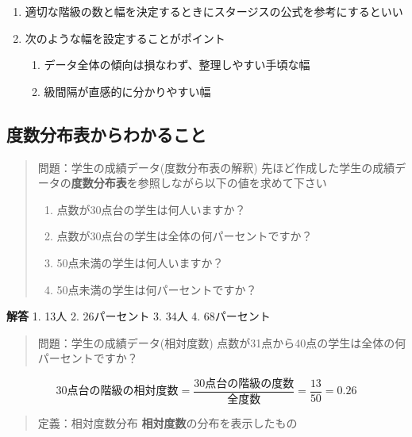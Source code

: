 \documentclass[
]{book}
\providecommand{\tightlist}{%
  \setlength{\itemsep}{0pt}\setlength{\parskip}{0pt}}
\theoremstyle{definition}
\theoremstyle{definition}
\theoremstyle{definition}
\theoremstyle{definition}
\theoremstyle{remark}
\begin{document}
\begin{enumerate}
\def\labelenumi{\arabic{enumi}.}
\setcounter{enumi}{1}
\item
  適切な階級の数と幅を決定するときにスタージスの公式を参考にするといい
\item
  次のような幅を設定することがポイント

  \begin{enumerate}
  \def\labelenumii{\arabic{enumii}.}
  \tightlist
  \item
    データ全体の傾向は損なわず、整理しやすい手頃な幅
  \item
    級間隔が直感的に分かりやすい幅
  \end{enumerate}
\end{enumerate}

\hypertarget{ux5ea6ux6570ux5206ux5e03ux8868ux304bux3089ux308fux304bux308bux3053ux3068}{%
\subsection{度数分布表からわかること}\label{ux5ea6ux6570ux5206ux5e03ux8868ux304bux3089ux308fux304bux308bux3053ux3068}}

\begin{quote}
問題：学生の成績データ(度数分布表の解釈)
先ほど作成した学生の成績データの\textbf{度数分布表}を参照しながら以下の値を求めて下さい

\begin{enumerate}
\def\labelenumi{\arabic{enumi}.}
\tightlist
\item
  点数が30点台の学生は何人いますか？
\item
  点数が30点台の学生は全体の何パーセントですか？
\item
  50点未満の学生は何人いますか？
\item
  50点未満の学生は何パーセントですか？
\end{enumerate}
\end{quote}

\textbf{解答}
1. 13人
2. 26パーセント
3. 34人
4. 68パーセント

\begin{quote}
問題：学生の成績データ(相対度数)
点数が31点から40点の学生は全体の何パーセントですか？
\end{quote}

\[
\text{30点台の階級の相対度数}
=\frac{\text{30点台の階級の度数}}{\text{全度数}}
=\frac{13}{50}=0.26
\]

\begin{quote}
定義：相対度数分布
\textbf{相対度数}の分布を表示したもの
\end{quote}
\end{document}
